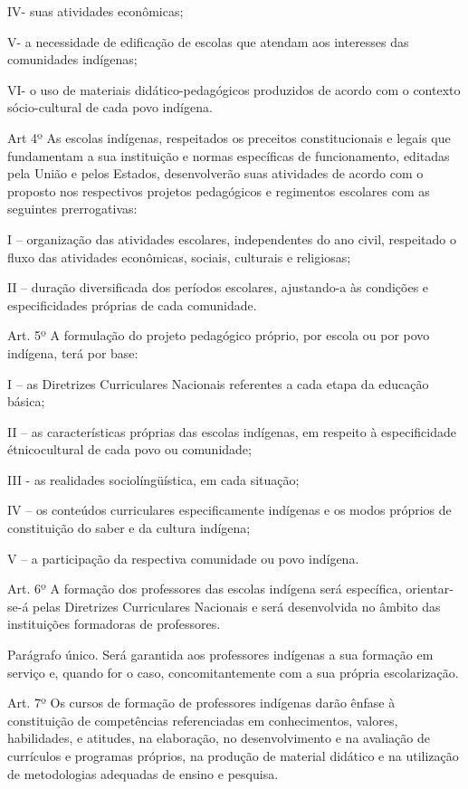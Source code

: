 \documentclass[
]{book}
\begin{document}
IV- suas atividades econômicas;

V- a necessidade de edificação de escolas que atendam aos interesses das comunidades indígenas;

VI- o uso de materiais didático-pedagógicos produzidos de acordo com o contexto sócio-cultural de cada povo indígena.

Art 4º As escolas indígenas, respeitados os preceitos constitucionais e legais que fundamentam a sua instituição e normas específicas de funcionamento, editadas pela União e pelos Estados, desenvolverão suas atividades de acordo com o proposto nos respectivos projetos pedagógicos e regimentos escolares com as seguintes prerrogativas:

I -- organização das atividades escolares, independentes do ano civil, respeitado o fluxo das atividades econômicas, sociais, culturais e religiosas;

II -- duração diversificada dos períodos escolares, ajustando-a às condições e especificidades próprias de cada comunidade.

Art. 5º A formulação do projeto pedagógico próprio, por escola ou por povo indígena, terá por base:

I -- as Diretrizes Curriculares Nacionais referentes a cada etapa da educação básica;

II -- as características próprias das escolas indígenas, em respeito à especificidade étnicocultural de cada povo ou comunidade;

III - as realidades sociolíngüística, em cada situação;

IV -- os conteúdos curriculares especificamente indígenas e os modos próprios de constituição do saber e da cultura indígena;

V -- a participação da respectiva comunidade ou povo indígena.

Art. 6º A formação dos professores das escolas indígena será específica, orientar-se-á pelas Diretrizes Curriculares Nacionais e será desenvolvida no âmbito das instituições formadoras de professores.

Parágrafo único. Será garantida aos professores indígenas a sua formação em serviço e, quando for o caso, concomitantemente com a sua própria escolarização.

Art. 7º Os cursos de formação de professores indígenas darão ênfase à constituição de competências referenciadas em conhecimentos, valores, habilidades, e atitudes, na elaboração, no desenvolvimento e na avaliação de currículos e programas próprios, na produção de material didático e na utilização de metodologias adequadas de ensino e pesquisa.
\end{document}

